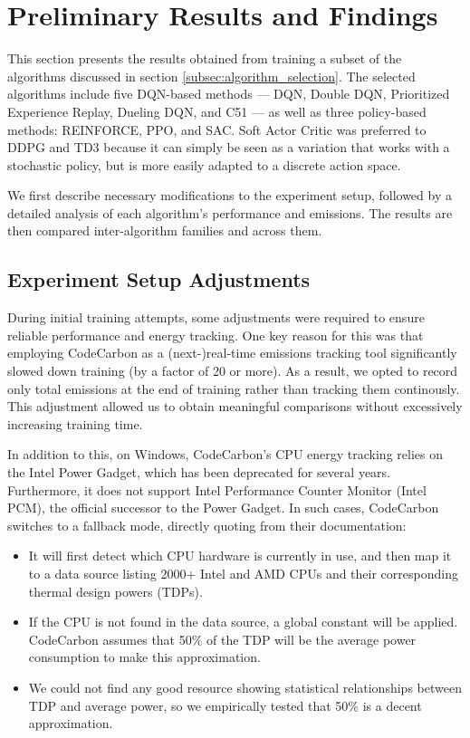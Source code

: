 \section{Preliminary Results and Findings}
\label{sec:preliminary_results}

This section presents the results obtained from training a subset of the algorithms discussed in section \ref{subsec:algorithm_selection}. The selected algorithms include five DQN-based methods — DQN, Double DQN, Prioritized Experience Replay, Dueling DQN, and C51 — as well as three policy-based methods: REINFORCE, PPO, and SAC. Soft Actor Critic was preferred to DDPG and TD3 because it can simply be seen as a variation that works with a stochastic policy, but is more easily adapted to a discrete action space.

We first describe necessary modifications to the experiment setup, followed by a detailed analysis of each algorithm's performance and emissions. The results are then compared inter-algorithm families and across them.

\subsection{Experiment Setup Adjustments}
\label{subsec:exp_setup_adjustments}
During initial training attempts, some adjustments were required to ensure reliable performance and energy tracking. One key reason for this was that employing CodeCarbon as a (next-)real-time emissions tracking tool significantly slowed down training (by a factor of 20 or more). As a result, we opted to record only total emissions at the end of training rather than tracking them continously. This adjustment allowed us to obtain meaningful comparisons without excessively increasing training time.

In addition to this, on Windows, CodeCarbon's CPU energy tracking relies on the Intel Power Gadget, which has been deprecated for several years. Furthermore, it does not support Intel Performance Counter Monitor (Intel PCM), the official successor to the Power Gadget. In such cases, CodeCarbon switches to a fallback mode, directly quoting from their documentation:
\begin{quoting}
	\begin{itemize}
		\item It will first detect which CPU hardware is currently in use, and then map it to a data source listing 2000+ Intel and AMD CPUs and their corresponding thermal design powers (TDPs).
		
		\item If the CPU is not found in the data source, a global constant will be applied. CodeCarbon assumes that 50\% of the TDP will be the average power consumption to make this approximation.
		
		\item We could not find any good resource showing statistical relationships between TDP and average power, so we empirically tested that 50\% is a decent approximation.
	\end{itemize}
\end{quoting}

